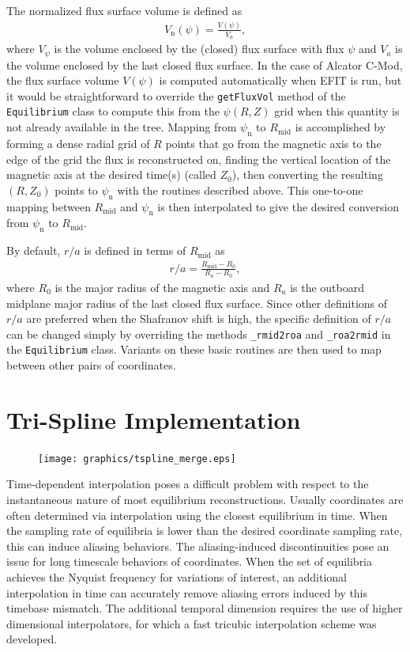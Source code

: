 \documentclass[12pt,floatfix,showpacs]{revtex4-1}
\begin{document}
The normalized flux surface volume is defined as
\begin{gather}
	V_{\text{n}}(\psi) = \frac{V(\psi)}{V_{a}},
\end{gather}
where $V_{\psi}$ is the volume enclosed by the (closed) flux surface with flux $\psi$ and $V_{a}$ is the volume enclosed by the last closed flux surface.
In the case of Alcator C-Mod, the flux surface volume $V(\psi)$ is computed automatically when EFIT is run, but it would be straightforward to override the \verb|getFluxVol| method of the \verb|Equilibrium| class to compute this from the $\psi(R, Z)$ grid when this quantity is not already available in the tree.
Mapping from $\psi_{\text{n}}$ to $R_{\text{mid}}$ is accomplished by forming a dense radial grid of $R$ points that go from the magnetic axis to the edge of the grid the flux is reconstructed on, finding the vertical location of the magnetic axis at the desired time(s) (called $Z_{0}$), then converting the resulting $(R, Z_{0})$ points to $\psi_{\text{n}}$ with the routines described above.
This one-to-one mapping between $R_{\text{mid}}$ and $\psi_{\text{n}}$ is then interpolated to give the desired conversion from $\psi_{\text{n}}$ to $R_{\text{mid}}$.

By default, $r/a$ is defined in terms of $R_{\text{mid}}$ as
\begin{gather}
	r/a = \frac{R_{\text{mid}} - R_{0}}{R_{a} - R_{0}},
\end{gather}
where $R_{0}$ is the major radius of the magnetic axis and $R_{a}$ is the outboard midplane major radius of the last closed flux surface.
Since other definitions of $r/a$ are preferred when the Shafranov shift is high, the specific definition of $r/a$ can be changed simply by overriding the methods \verb|_rmid2roa| and \verb|_roa2rmid| in the \verb|Equilibrium| class.
Variants on these basic routines are then used to map between other pairs of coordinates.

\section{Tri-Spline Implementation}\label{sec:trispline}

\begin{figure}[ht]
 \texttt{[image: graphics/tspline\_merge.eps]}
 \caption{}
 \label{fig:tspline}
\end{figure}

Time-dependent interpolation poses a difficult problem with respect to the instantaneous nature of most equilibrium reconstructions. 
Usually coordinates are often determined via interpolation using the closest equilibrium in time.
When the sampling rate of equilibria is lower than the desired coordinate sampling rate, this can induce aliasing behaviors. 
The aliasing-induced discontinuities pose an issue for long timescale behaviors of coordinates.  
When the set of equilibria achieves the Nyquist frequency for variations of interest, an additional interpolation in time can accurately remove aliasing errors induced by this timebase mismatch. 
The additional temporal dimension requires the use of higher dimensional interpolators, for which a fast tricubic interpolation scheme was developed. 
\end{document}
